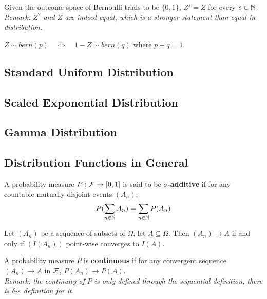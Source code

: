 \documentclass{article}
\begin{document}
   	\begin{proposition}[Invariance]
   		Given the outcome space of Bernoulli trials to be $\{0, 1\}$, $Z^s = Z$ for every $s \in \mathbb{N}$. \\
   		\emph{Remark: $Z^2$ and $Z$ are indeed equal, which is a stronger statement than equal in distribution.}
   	\end{proposition}
   	
   	\begin{proposition}[Negation]
   		$Z \sim bern(p) \quad \Leftrightarrow \quad 1-Z \sim bern(q)$ where $p + q = 1$.
   	\end{proposition}
   	
   	\subsection{Standard Uniform Distribution}
   	
   	\subsection{Scaled Exponential Distribution}
   	
   	\subsection{Gamma Distribution}
   	
   	\subsection{Distribution Functions in General}
   	\begin{definition}
   		A probability measure $P: \mathcal{{F}} \to [0, 1]$ is said to be \textbf{$\sigma$-additive} if for any countable mutually disjoint events $(A_n)$,
   		\begin{align}
   			P(\sum_{n \in \mathbb{N}} A_n) = \sum_{n \in \mathbb{N}} P(A_n)
   		\end{align}
   	\end{definition}
   	
   	\begin{definition}
   		Let $(A_n)$ be a sequence of subsets of $\Omega$, let $A \subseteq \Omega$. Then $(A_n) \to A$ if and only if $(I(A_n))$ point-wise converges to $I(A)$.
   	\end{definition}
   	
   	\begin{definition}
   		A probability measure $P$ is \textbf{continuous} if for any convergent sequence $(A_n) \to A$ in $\mathcal{{F}}$, $P(A_n) \to P(A)$. \\
   		\emph{Remark: the continuity of $P$ is only defined through the sequential definition, there is $\delta$-$\varepsilon$ definition for it.}
   	\end{definition}
   	
\end{document}
